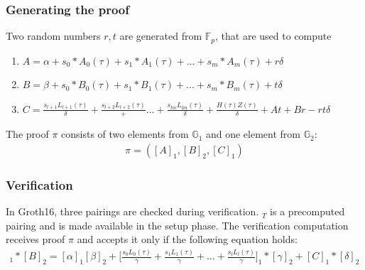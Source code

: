 \subsubsection{Generating the proof}

Two random numbers \(r, t\) are generated from \begin{math}\mathbb{F}_p\end{math}, that are used to compute

\begin{enumerate}
    \item \begin{math} A= \alpha + s_0*A_0(\tau) + s_1*A_1(\tau) + ... + s_m*A_m(\tau) + r\delta\end{math}
    \item \begin{math} B= \beta + s_0*B_0(\tau) + s_1*B_1(\tau) + ... + s_m*B_m(\tau) + t\delta\end{math}
    \item \begin{math} C= \frac{s_{l+1}L_{l+1}(\tau)}{\delta} + \frac{s_{l+2}L_{l+2}(\tau)} + ... +\frac{s_{lm}L_{lm}(\tau)}{\delta} + \frac{H(\tau)Z(\tau)}{\delta} + At + Br - rt\delta\end{math}
\end{enumerate}

The proof \begin{math}\pi\end{math} consists of two elements from \begin{math}\mathbb{G}_1\end{math} and one element from \begin{math}\mathbb{G}_2\end{math}:
\begin{align}
    \pi = ([A]_1, [B]_2, [C]_1)
\end{align}

\subsubsection{Verification}

In Groth16, three pairings are checked during verification. \begin{math}[\alpha * \beta]_T\end{math} is a precomputed pairing and is made available in the setup phase. The verification computation receives proof \begin{math} \pi\end{math} and accepts it only if the following equation holds:
\begin{align}
    [A]_1 * [B]_2 = [\alpha]_1[\beta]_2 + \bigl[\frac{s_0L_0(\tau)}{\gamma}+ \frac{s_1L_1(\tau)}{\gamma} + ... + \frac{s_lL_l(\tau)}{\gamma}\bigr]_1 * [\gamma]_2 + [C]_1 * [\delta]_2
\end{align}

